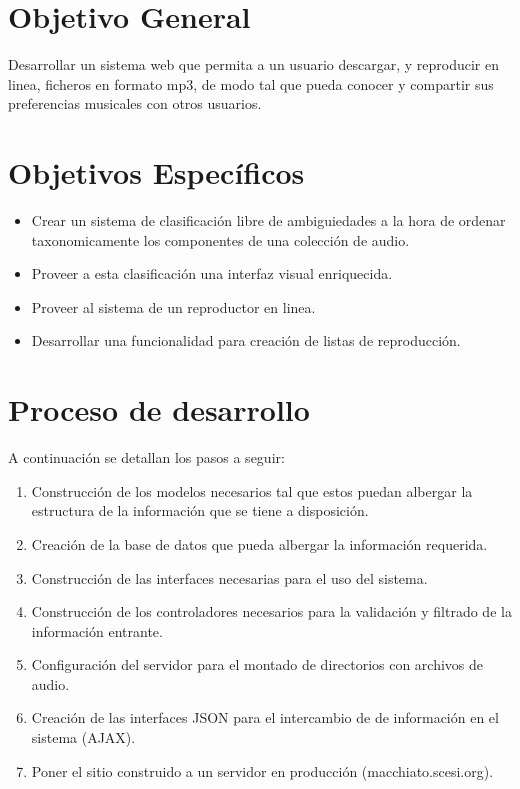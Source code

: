 \documentclass[letter,12pt]{article}
\begin{document}
\section{Objetivo General}
Desarrollar un sistema web que permita a un usuario descargar, y reproducir en linea, ficheros en formato
mp3, de modo tal que pueda conocer y compartir sus preferencias musicales con otros usuarios.

\section{Objetivos Específicos}
\begin{itemize}
\item Crear un sistema de clasificación libre de ambiguiedades a la hora de ordenar taxonomicamente los
componentes de una colección de audio.
\item Proveer a esta clasificación una interfaz visual enriquecida.
\item Proveer al sistema de un reproductor en linea.
\item Desarrollar una funcionalidad para creación de listas de reproducción.
\end{itemize}

\section{Proceso de desarrollo}
A continuación se detallan los pasos a seguir:

\begin{enumerate}
\item Construcción de los modelos necesarios tal que estos puedan albergar la estructura de la
información que se tiene a disposición.
\item Creación de la base de datos que pueda albergar la información requerida.
\item Construcción de las interfaces necesarias para el uso del sistema.
\item Construcción de los controladores necesarios para la validación y filtrado de la información
entrante.
\item Configuración del servidor para el montado de directorios con archivos de audio.
\item Creación de las interfaces JSON para el intercambio de de información en el sistema (AJAX).
\item Poner el sitio construido a un servidor en producción (macchiato.scesi.org).
\end{enumerate}
\end{document}
